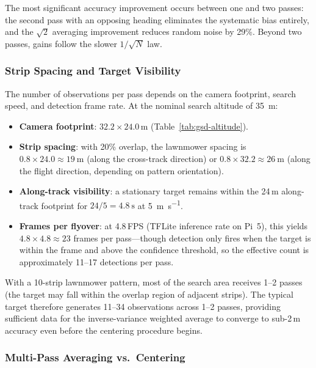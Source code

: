 \noindent The most significant accuracy improvement occurs between one and two passes: the second pass with an opposing heading eliminates the systematic bias entirely, and the $\sqrt{2}$ averaging improvement reduces random noise by 29\%.  Beyond two passes, gains follow the slower $1/\sqrt{N}$ law.

\subsubsection{Strip Spacing and Target Visibility}\label{sec:gps:strip-visibility}

The number of observations per pass depends on the camera footprint, search speed, and detection frame rate.  At the nominal search altitude of \SI{35}{\metre}:

\begin{itemize}
  \item \textbf{Camera footprint}: $32.2 \times 24.0$\,m (Table~\ref{tab:gsd-altitude}).
  \item \textbf{Strip spacing}: with 20\% overlap, the lawnmower spacing is $0.8 \times 24.0 \approx \SI{19}{\metre}$ (along the cross-track direction) or $0.8 \times 32.2 \approx \SI{26}{\metre}$ (along the flight direction, depending on pattern orientation).
  \item \textbf{Along-track visibility}: a stationary target remains within the 24\,m along-track footprint for $24 / 5 = \SI{4.8}{\second}$ at \SI{5}{\metre\per\second}.
  \item \textbf{Frames per flyover}: at 4.8\,FPS (TFLite inference rate on Pi~5), this yields $4.8 \times 4.8 \approx 23$ frames per pass---though detection only fires when the target is within the frame and above the confidence threshold, so the effective count is approximately 11--17 detections per pass.
\end{itemize}

\noindent With a 10-strip lawnmower pattern, most of the search area receives 1--2 passes (the target may fall within the overlap region of adjacent strips).  The typical target therefore generates 11--34 observations across 1--2 passes, providing sufficient data for the inverse-variance weighted average to converge to sub-2\,m accuracy even before the centering procedure begins.

\subsubsection{Multi-Pass Averaging vs.\ Centering}\label{sec:multipass-vs-centering}

